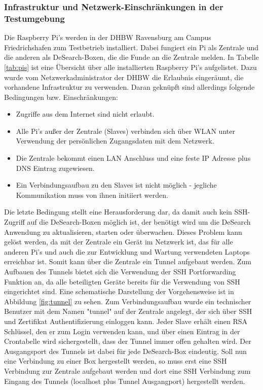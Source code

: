 \subsubsection{Infrastruktur und Netzwerk-Einschränkungen in der Testumgebung}\label{sssec:tunnel}
Die Raspberry Pi's werden in der DHBW Ravensburg am Campus Friedrichshafen zum Testbetrieb installiert. Dabei fungiert ein Pi als Zentrale und die anderen als DeSearch-Boxen, die die Funde an die Zentrale melden. In Tabelle \ref{tab:pis} ist eine Übersicht über alle installierten Raspberry Pi's aufgelistet.
Dazu wurde vom Netzwerkadministrator der DHBW die Erlaubnis eingeräumt, die vorhandene Infrastruktur zu verwenden. Daran geknüpft sind allerdings folgende Bedingungen bzw. Einschränkungen:
\begin{itemize}
	\item Zugriffe aus dem Internet sind nicht erlaubt.
	\item Alle Pi's außer der Zentrale (Slaves) verbinden sich über WLAN unter Verwendung der persönlichen Zugangsdaten mit dem Netzwerk.
	\item Die Zentrale bekommt einen LAN Anschluss und eine feste IP Adresse plus DNS Eintrag zugewiesen.
	\item Ein Verbindungsaufbau zu den Slaves ist nicht möglich - jegliche Kommunikation muss von ihnen initiiert werden.
\end{itemize}
Die letzte Bedingung stellt eine Herausforderung dar, da damit auch kein SSH-Zugriff auf die DeSearch-Boxen möglich ist, der benötigt wird um die DeSearch Anwendung zu aktualisieren, starten oder überwachen.
Dieses Problem kann gelöst werden, da mit der Zentrale ein Gerät im Netzwerk ist, das für alle anderen Pi's und auch die zur Entwicklung und Wartung verwendeten Laptops erreichbar ist. Somit kann über die Zentrale ein Tunnel aufgebaut werden.
Zum Aufbauen des Tunnels bietet sich die Verwendung der SSH Portforwarding Funktion an, da alle beteiligten Geräte bereits für die Verwendung von SSH eingerichtet sind. Eine schematische Darstellung der Vorgehensweise ist in Abbildung \ref{fig:tunnel} zu sehen.
Zum Verbindungsaufbau wurde ein technischer Benutzer mit dem Namen "tunnel" auf der Zentrale angelegt, der sich über SSH und Zertifikat Authentifizierung einloggen kann.
Jeder Slave erhält einen RSA Schlüssel, den er zum Login verwenden kann, und über einen Eintrag in der Crontabelle wird sichergestellt, dass der Tunnel immer offen gehalten wird.
Der Ausgangsport des Tunnels ist dabei für jede DeSearch-Box eindeutig. Soll nun eine Verbindung zu einer Box hergestellt werden, so muss erst eine SSH Verbindung zur Zentrale aufgebaut werden und dort eine SSH Verbindung zum Eingang des Tunnels (localhost plus Tunnel Ausgangport) hergestellt werden.
